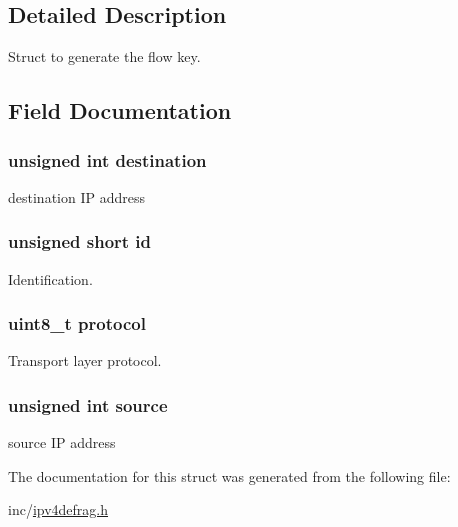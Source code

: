 \subsection{Detailed Description}
Struct to generate the flow key. 

\subsection{Field Documentation}
\hypertarget{structntoh__ipv4__tuple4__t_aa2b73075fb6a7866116ece24e01ea950}{
\subsubsection[{destination}]{\setlength{\rightskip}{0pt plus 5cm}unsigned int destination}}\label{structntoh__ipv4__tuple4__t_aa2b73075fb6a7866116ece24e01ea950}


destination I\-P address 

\hypertarget{structntoh__ipv4__tuple4__t_a2e74aff868562e644e5d582929433363}{
\subsubsection[{id}]{\setlength{\rightskip}{0pt plus 5cm}unsigned short id}}\label{structntoh__ipv4__tuple4__t_a2e74aff868562e644e5d582929433363}


Identification. 

\hypertarget{structntoh__ipv4__tuple4__t_ad124d3d2e02c729afa303c775295278e}{
\subsubsection[{protocol}]{\setlength{\rightskip}{0pt plus 5cm}uint8\-\_\-t protocol}}\label{structntoh__ipv4__tuple4__t_ad124d3d2e02c729afa303c775295278e}


Transport layer protocol. 

\hypertarget{structntoh__ipv4__tuple4__t_a32ee136f9a3309d9f5aec70ddaebc420}{
\subsubsection[{source}]{\setlength{\rightskip}{0pt plus 5cm}unsigned int source}}\label{structntoh__ipv4__tuple4__t_a32ee136f9a3309d9f5aec70ddaebc420}


source I\-P address 



The documentation for this struct was generated from the following file\-:\begin{DoxyCompactItemize}
\item 
inc/\hyperlink{ipv4defrag_8h}{ipv4defrag.\-h}\end{DoxyCompactItemize}
